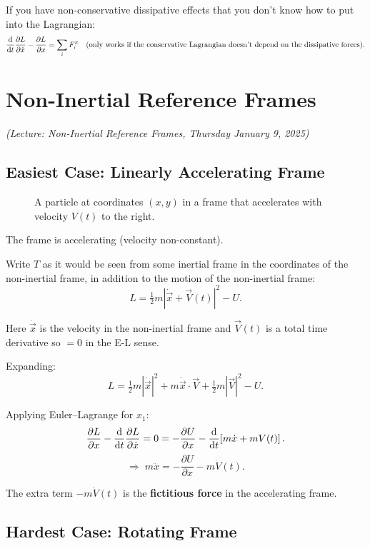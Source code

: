 If you have non-conservative dissipative effects that you don't know how to put
into the Lagrangian:
\[
    \dv{t}\frac{\partial L}{\partial \dot{x}} - \frac{\partial L}{\partial x}
    = \sum_i F_i^x
    \quad \text{(only works if the conservative Lagrangian doesn't depend on the
    dissipative forces)}.
\]

\chapter{Non-Inertial Reference Frames}

\textit{(Lecture: Non-Inertial Reference Frames, Thursday January 9, 2025)}

\section{Easiest Case: Linearly Accelerating Frame}

\begin{figure}[H]
    \centering
    \caption{A particle at coordinates $(x, y)$ in a frame that accelerates with
    velocity $V(t)$ to the right.}
\end{figure}

The frame is accelerating (velocity non-constant).

Write $T$ as it would be seen from some inertial frame in the coordinates of the
non-inertial frame, in addition to the motion of the non-inertial frame:
\[
    L = \tfrac{1}{2}m\left|\dot{\vec{x}} + \vec{V}(t)\right|^2 - U.
\]

Here $\dot{\vec{x}}$ is the velocity in the non-inertial frame and $\vec{V}(t)$ is a
total time derivative so $= 0$ in the E-L sense.

Expanding:
\[
    L = \tfrac{1}{2}m|\dot{\vec{x}}|^2 + m\dot{\vec{x}}\cdot\vec{V} + \tfrac{1}{2}m|\vec{V}|^2 - U.
\]

Applying Euler--Lagrange for $x_1$:
\[
    \frac{\partial L}{\partial x} - \dv{t}\frac{\partial L}{\partial \dot{x}}
    = 0 = -\frac{\partial U}{\partial x} - \dv{t}\!\left[m\dot{x} + mV(t)\right].
\]
\[
    \Rightarrow\; m\ddot{x} = -\frac{\partial U}{\partial x} - m\dot{V}(t).
\]

The extra term $-m\dot{V}(t)$ is the \textbf{fictitious force} in the accelerating frame.

\section{Hardest Case: Rotating Frame}

